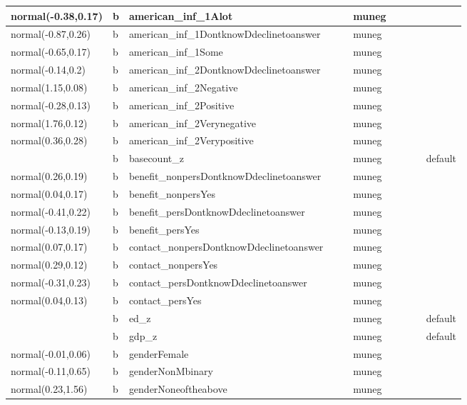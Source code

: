 \documentclass[
]{book}
\theoremstyle{definition}
\theoremstyle{definition}
\theoremstyle{definition}
\theoremstyle{definition}
\theoremstyle{remark}
\begin{document}
\begin{table}
\begin{tabular}[t]{l|l|l|l|l|l|l|l|l|l}
\hline
normal(-0.38,0.17) & b & american\_inf\_1Alot &  &  & muneg &  &  &  & \\
\hline
normal(-0.87,0.26) & b & american\_inf\_1DontknowDdeclinetoanswer &  &  & muneg &  &  &  & \\
\hline
normal(-0.65,0.17) & b & american\_inf\_1Some &  &  & muneg &  &  &  & \\
\hline
normal(-0.14,0.2) & b & american\_inf\_2DontknowDdeclinetoanswer &  &  & muneg &  &  &  & \\
\hline
normal(1.15,0.08) & b & american\_inf\_2Negative &  &  & muneg &  &  &  & \\
\hline
normal(-0.28,0.13) & b & american\_inf\_2Positive &  &  & muneg &  &  &  & \\
\hline
normal(1.76,0.12) & b & american\_inf\_2Verynegative &  &  & muneg &  &  &  & \\
\hline
normal(0.36,0.28) & b & american\_inf\_2Verypositive &  &  & muneg &  &  &  & \\
\hline
 & b & basecount\_z &  &  & muneg &  &  &  & default\\
\hline
normal(0.26,0.19) & b & benefit\_nonpersDontknowDdeclinetoanswer &  &  & muneg &  &  &  & \\
\hline
normal(0.04,0.17) & b & benefit\_nonpersYes &  &  & muneg &  &  &  & \\
\hline
normal(-0.41,0.22) & b & benefit\_persDontknowDdeclinetoanswer &  &  & muneg &  &  &  & \\
\hline
normal(-0.13,0.19) & b & benefit\_persYes &  &  & muneg &  &  &  & \\
\hline
normal(0.07,0.17) & b & contact\_nonpersDontknowDdeclinetoanswer &  &  & muneg &  &  &  & \\
\hline
normal(0.29,0.12) & b & contact\_nonpersYes &  &  & muneg &  &  &  & \\
\hline
normal(-0.31,0.23) & b & contact\_persDontknowDdeclinetoanswer &  &  & muneg &  &  &  & \\
\hline
normal(0.04,0.13) & b & contact\_persYes &  &  & muneg &  &  &  & \\
\hline
 & b & ed\_z &  &  & muneg &  &  &  & default\\
\hline
 & b & gdp\_z &  &  & muneg &  &  &  & default\\
\hline
normal(-0.01,0.06) & b & genderFemale &  &  & muneg &  &  &  & \\
\hline
normal(-0.11,0.65) & b & genderNonMbinary &  &  & muneg &  &  &  & \\
\hline
normal(0.23,1.56) & b & genderNoneoftheabove &  &  & muneg &  &  &  & \\

\end{tabular}
\end{table}
\end{document}
